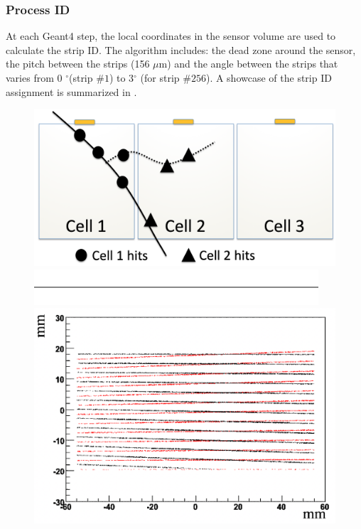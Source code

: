 \subsubsection{Process ID}

At each Geant4 step, the local coordinates in the sensor volume are used to calculate the strip ID.
The algorithm includes: the dead zone around the sensor, the pitch between the strips (156 $\mu$m) and the angle
between the strips that varies from 0 $^{\circ}$(strip $\# 1$) to 3$^{\circ}$ (for strip  $\# 256$). A showcase of the strip ID assignment
is summarized in .

\begin{figure}
	\centering
	\includegraphics[width=0.99\columnwidth,keepaspectratio]{img/bstHit.png}
	\includegraphics[width=0.99\columnwidth,keepaspectratio]{img/blank.png}
	\includegraphics[width=0.99\columnwidth,keepaspectratio]{img/bstStrip.png}

\end{figure}
